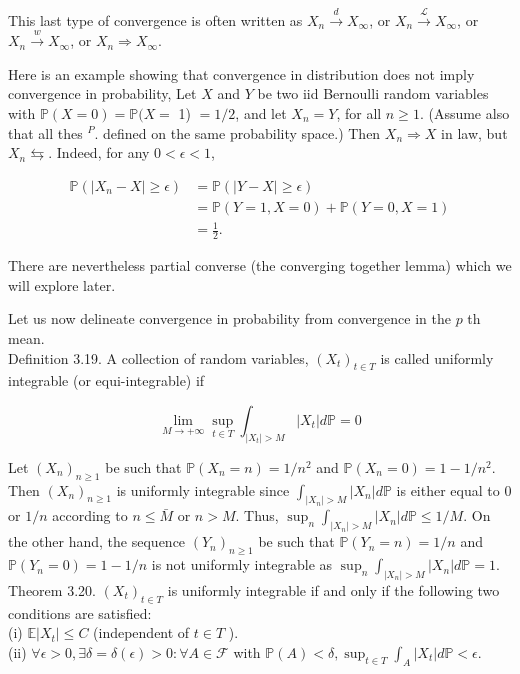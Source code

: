 \documentclass[11pt]{amsbook}
\theoremstyle{plain}%
\theoremstyle{definition}
\theoremstyle{remark}
\begin{document}
This last type of convergence is often written as $X_{n} \xrightarrow{d} X_{\infty}$, or $X_{n} \xrightarrow{\mathcal{L}} X_{\infty}$, or $X_{n} \xrightarrow{w} X_{\infty}$, or $X_{n} \Longrightarrow X_{\infty}$.

Here is an example showing that convergence in distribution does not imply convergence in probability, Let $X$ and $Y$ be two iid Bernoulli random variables with $\mathbb{P}(X=0)=\mathbb{P}(X=$ 1) $=1 / 2$, and let $X_{n}=Y$, for all $n \geq 1$. (Assume also that all thes ${ }^{P}$. defined on the same probability space.) Then $X_{n} \Rightarrow X$ in law, but $X_{n} \leftrightarrows$. Indeed, for any $0<\epsilon<1$,

$$
\begin{aligned}
\mathbb{P}\left(\left|X_{n}-X\right| \geq \epsilon\right) & =\mathbb{P}(|Y-X| \geq \epsilon) \\
& =\mathbb{P}(Y=1, X=0)+\mathbb{P}(Y=0, X=1) \\
& =\frac{1}{2} .
\end{aligned}
$$

There are nevertheless partial converse (the converging together lemma) which we will explore later.

Let us now delineate convergence in probability from convergence in the $p$ th mean.\\
Definition 3.19. A collection of random variables, $\left(X_{t}\right)_{t \in T}$ is called uniformly integrable (or equi-integrable) if

$$
\lim _{M \rightarrow+\infty} \sup _{t \in T} \int_{\left|X_{t}\right|>M}\left|X_{t}\right| d \mathbb{P}=0
$$

Let $\left(X_{n}\right)_{n \geq 1}$ be such that $\mathbb{P}\left(X_{n}=n\right)=1 / n^{2}$ and $\mathbb{P}\left(X_{n}=0\right)=1-1 / n^{2}$. Then $\left(X_{n}\right)_{n \geq 1}$ is uniformly integrable since $\int_{\left|X_{n}\right|>M}\left|X_{n}\right| d \mathbb{P}$ is either equal to 0 or $1 / n$ according to $n \leq \bar{M}$ or $n>M$. Thus, $\sup _{n} \int_{\left|X_{n}\right|>M}\left|X_{n}\right| d \mathbb{P} \leq 1 / M$. On the other hand, the sequence $\left(Y_{n}\right)_{n \geq 1}$ be such that $\mathbb{P}\left(Y_{n}=n\right)=1 / n$ and $\mathbb{P}\left(Y_{n}=0\right)=1-1 / n$ is not uniformly integrable as $\sup _{n} \int_{\left|X_{n}\right|>M}\left|X_{n}\right| d \mathbb{P}=1$.\\
Theorem 3.20. $\left(X_{t}\right)_{t \in T}$ is uniformly integrable if and only if the following two conditions are satisfied:\\
(i) $\mathbb{E}\left|X_{t}\right| \leq C$ (independent of $t \in T$ ).\\
(ii) $\forall \epsilon>0, \exists \delta=\delta(\epsilon)>0: \forall A \in \mathcal{F}$ with $\mathbb{P}(A)<\delta, \sup _{t \in T} \int_{A}\left|X_{t}\right| d \mathbb{P}<\epsilon$.
\end{document}
